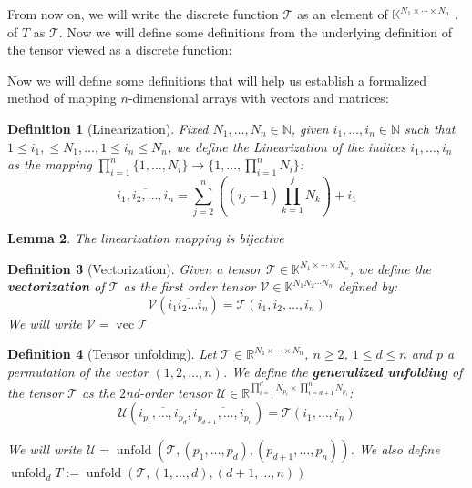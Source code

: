\documentclass[11pt,a4paper,openright,oneside]{book}
\numberwithin{equation}{section}
\newtheorem{defn0}{Definition}[chapter]
\newtheorem{lemma0}[defn0]{Lemma}
\newenvironment{definition}{ \begin{defn0}}{\end{defn0}}
\newenvironment{lemma}{\bigskip \begin{lemma0}}{\end{lemma0}}
\DeclareMathOperator{\vectorize}{vec}
\DeclareMathOperator{\unfolding}{unfold}
\begin{document}
From now on, we will write the discrete function $\mathcal{T}$ as
an element of ${\mathbb{K}^{N_1 \times \cdots \times N_n}}$ \cite{yokotaVeryBasicsTensors2024}.
of $T$ as $\mathcal{T}$. Now we will define some definitions from the underlying definition of the tensor viewed as a discrete function:

Now we will define some definitions that will help us establish a formalized method of mapping $n$-dimensional arrays with
vectors and matrices:

\begin{definition}[Linearization]
    Fixed $N_1, \dots, N_n \in \mathbb{N}$, given $i_1, \dots, i_n \in \mathbb{N}$ such that $1 \leqslant i_1, \leqslant N_1, \dots, 1 \leqslant i_n \leqslant N_n$,
    we define the Linearization of the indices $i_1, \dots, i_n$ as the mapping ${\prod_{i=1}^n \{1, \dots, N_i\} \rightarrow \{1, \dots, \prod_{i=1}^n N_i\}}$:
    $$\overline {i_1, i_2, \dots, i_n} = \sum_{j=2}^{n} \left( (i_j - 1) \prod_{k=1}^j N_k \right) + i_1$$
\end{definition}

\begin{lemma}
    The linearization mapping is bijective
\end{lemma}

\begin{definition}[Vectorization]
    Given a tensor $\mathcal{T} \in \mathbb{K}^{N_1 \times \cdots \times N_n}$, we define the \textbf{vectorization} of $\mathcal{T}$
    as the first order tensor $\mathcal{V} \in \mathbb{K}^{N_1 N_2 \cdots N_n}$ defined by:
    $$\mathcal{V}(\overline{i_1 i_2 \dots i_n}) = \mathcal{T}(i_1, i_2, \dots, i_n)$$
    We will write $\mathcal{V} = \vectorize{\mathcal{T}}$
\end{definition}


\begin{definition}[Tensor unfolding]
Let $\mathcal{T} \in \mathbb{R}^{N_1 \times \cdots \times N_n}$, $n \geqslant 2$, $1 \leqslant d \leqslant n$ and $p$ a permutation of the vector $(1,2,\dots, n)$. We define the
\textbf{generalized unfolding} of the tensor $\mathcal{T}$ as the $2$nd-order tensor 
$\mathcal{U} \in \mathbb{R}^{\prod_{i=1}^d N_{p_i} \times \prod_{i=d+1}^n N_{p_i}}$:
$$ \mathcal{U} (\overline{i_{p_1}, \dots, i_{p_d}}, \overline{i_{p_{d+1}}, \dots, i_{p_n}}) = \mathcal{T}(i_1, \dots, i_n)$$

We will write $\mathcal{U} = \unfolding{(\mathcal{T}, (p_1, \dots, p_d), (p_{d+1}, \dots, p_n))}$. 
We also define $\unfolding_d T := \unfolding{(\mathcal{T}, (1, \dots, d), (d+1, \dots, n))}$
\end{definition}
\end{document}
